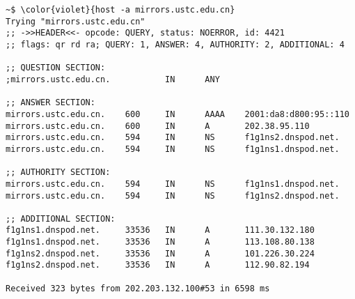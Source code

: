 \documentclass[varwidth=36.3em,crop]{standalone}
\begin{document}
\begin{Verbatim}[commandchars=\\\{\}]
~$ \color{violet}{host -a mirrors.ustc.edu.cn}
Trying "mirrors.ustc.edu.cn"
;; ->>HEADER<<- opcode: QUERY, status: NOERROR, id: 4421
;; flags: qr rd ra; QUERY: 1, ANSWER: 4, AUTHORITY: 2, ADDITIONAL: 4

;; QUESTION SECTION:
;mirrors.ustc.edu.cn.           IN      ANY

;; ANSWER SECTION:
mirrors.ustc.edu.cn.    600     IN      AAAA    2001:da8:d800:95::110
mirrors.ustc.edu.cn.    600     IN      A       202.38.95.110
mirrors.ustc.edu.cn.    594     IN      NS      f1g1ns2.dnspod.net.
mirrors.ustc.edu.cn.    594     IN      NS      f1g1ns1.dnspod.net.

;; AUTHORITY SECTION:
mirrors.ustc.edu.cn.    594     IN      NS      f1g1ns1.dnspod.net.
mirrors.ustc.edu.cn.    594     IN      NS      f1g1ns2.dnspod.net.

;; ADDITIONAL SECTION:
f1g1ns1.dnspod.net.     33536   IN      A       111.30.132.180
f1g1ns1.dnspod.net.     33536   IN      A       113.108.80.138
f1g1ns2.dnspod.net.     33536   IN      A       101.226.30.224
f1g1ns2.dnspod.net.     33536   IN      A       112.90.82.194

Received 323 bytes from 202.203.132.100#53 in 6598 ms
\end{Verbatim}
\end{document}
